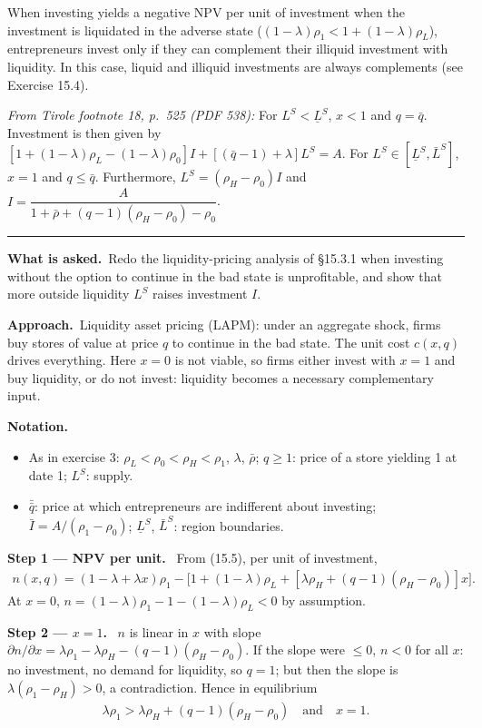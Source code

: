\documentclass[11pt,a4paper]{article}
\newcommand{\notation}{\par\noindent\textbf{Notation.}}
\newcommand{\step}[2]{\par\medskip\noindent\textbf{Step #1 --- #2.}~}
\newcommand{\asked}{\par\medskip\noindent\textbf{What is asked.}~}
\newcommand{\approach}{\par\smallskip\noindent\textbf{Approach.}~}
\newcommand{\stmtend}{\par\endgroup\nopagebreak\noindent\rule{\linewidth}{0.4pt}\par\medskip}
\begin{document}
When investing yields a negative NPV per unit of investment when the investment is liquidated in the
adverse state (\((1 - \lambda)\rho_1 < 1 + (1 - \lambda)\rho_L\)), entrepreneurs invest only if they
can complement their illiquid investment with liquidity. In this case, liquid and illiquid
investments are always complements (see Exercise 15.4).

\emph{From Tirole footnote 18, p.~525 (PDF 538):} For \(L^S < \underline L^S\), \(x < 1\) and
\(q = \bar q\). Investment is then given by
\([1 + (1 - \lambda)\rho_L - (1 - \lambda)\rho_0]I + [(\bar q - 1) + \lambda]L^S = A\). For
\(L^S \in [\underline L^S, \bar L^S]\), \(x = 1\) and \(q \leqslant \bar q\). Furthermore,
\(L^S = (\rho_H - \rho_0)I\) and
\(I = \dfrac{A}{1 + \bar\rho + (q - 1)(\rho_H - \rho_0) - \rho_0}\).
\stmtend

\asked Redo the liquidity-pricing analysis of \S15.3.1 when investing without the option to continue in the bad state is unprofitable, and show that more outside liquidity $L^S$ raises investment $I$.

\approach Liquidity asset pricing (LAPM): under an aggregate shock, firms buy stores of value at price $q$ to continue in the bad state. The unit cost $c(x,q)$ drives everything. Here $x=0$ is not viable, so firms either invest with $x=1$ and buy liquidity, or do not invest: liquidity becomes a necessary complementary input.

\notation
\begin{itemize}
  \item As in exercise 3: $\rho_L<\rho_0<\rho_H<\rho_1$, $\lambda$, $\bar\rho$; $q\geq1$: price of a store yielding 1 at date 1; $L^S$: supply.
  \item $\bar{\bar q}$: price at which entrepreneurs are indifferent about investing; $\bar I=A/(\rho_1-\rho_0)$; $\underline L^S$, $\bar L^S$: region boundaries.
\end{itemize}

\step{1}{NPV per unit} From (15.5), per unit of investment,
\begin{align}
  n(x,q) = (1-\lambda+\lambda x)\rho_1-\bigl[1+(1-\lambda)\rho_L+[\lambda\rho_H+(q-1)(\rho_H-\rho_0)]x\bigr]. \label{r10e13-npv}
\end{align}
At $x=0$, $n=(1-\lambda)\rho_1-1-(1-\lambda)\rho_L<0$ by assumption.

\step{2}{$x=1$} $n$ is linear in $x$ with slope $\partial n/\partial x=\lambda\rho_1-\lambda\rho_H-(q-1)(\rho_H-\rho_0)$. If the slope were $\leq0$, $n<0$ for all $x$: no investment, no demand for liquidity, so $q=1$; but then the slope is $\lambda(\rho_1-\rho_H)>0$, a contradiction. Hence in equilibrium
\begin{align}
  \lambda\rho_1>\lambda\rho_H+(q-1)(\rho_H-\rho_0) \quad\text{and}\quad x=1. \label{r10e13-x1}
\end{align}
\end{document}
